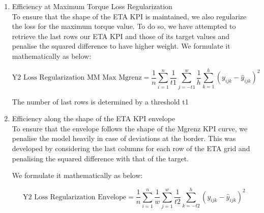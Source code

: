\documentclass{report} %
\begin{document}
\begin{enumerate}

\item Efficiency at Maximum Torque Loss Regularization \\

To ensure that the shape of the ETA \ac{KPI} is maintained, we also regularize the loss for the maximum torque value.
To do so, we have attempted to retrieve the last rows our ETA \ac{KPI} and those of its target values and penalise the squared difference to have higher weight.
We formulate it mathematically as below:

\begin{equation}
    \text{Y2 Loss Regularization MM Max Mgrenz} = \frac{1}{n} \sum_{i=1}^{n} \frac{1}{t1} \sum_{j=-t1}^{w} \frac{1}{h} \sum_{k=1}^{h} (y_{ijk} - \hat{y}_{ijk})^2
    \label{eq:Y2_Loss_Regularization_MM_Max_Mgrenz}
\end{equation}


\vspace{0.2cm} %

The number of last rows is determined by a threshold t1

\item Efficiency along the shape of the ETA \ac{KPI} envelope \\

To ensure that the envelope follows the shape of the Mgrenz \ac{KPI} curve, we penalise the model heavily in case of deviations at the border.
This was developed by considering the last columns for each row of the ETA grid and penalising the squared difference with that of the target.

We formulate it mathematically as below:

\begin{equation}
    \text{Y2 Loss Regularization Envelope} = \frac{1}{n} \sum_{i=1}^{n} \frac{1}{w} \sum_{j=1}^{w} \frac{1}{t2} \sum_{k=-t2}^{h} (y_{ijk} - \hat{y}_{ijk})^2
    \label{eq:Y2_Loss_Regularization_Envelope}
\end{equation}


\end{enumerate}
\end{document}
